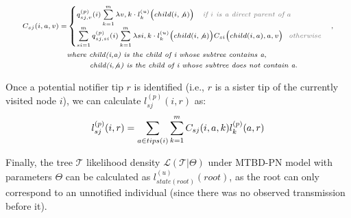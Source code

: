 \documentclass[a4paper,10pt]{article}
\begin{document}
\begin{equation}
\scriptsize
\begin{split}
C_{sj}(i,a,v) = &\begin{cases}
q^{(p)}_{sj,v}(i)
\sum\limits_{k=1}^{m}\lambda{v,k} \cdot l_{k}^{(u)}\Big(child(i, \not a)\Big) \textit{\color{gray}~~~if $i$ is a direct parent of $a$}
\\
\sum\limits_{si=1}^{m}q^{(p)}_{sj,si}(i)
\sum\limits_{k=1}^{m}\lambda{si,k} \cdot l_{k}^{(u)}\Big(child(i, \not a)\Big)C_{si}\Big(child(i, a),a,v\Big) \textit{\color{gray}~~otherwise}\\ 
\end{cases},
\\ &\textit{where child(i,a) is the child of i whose subtree contains a},
\\
 &\textit{~~~~~~~~child(i,$\not a$) is the child of i whose subtree does not contain a.}
\end{split}
\label{eq:c}
\end{equation}


Once a potential notifier tip $r$ is identified (i.e., $r$ is a sister tip of the currently visited node $i$), we can calculate $l^{(p)}_{sj}(i, r)$ as:
\begin{equation}
\scriptsize 
l^{(p)}_{sj}(i, r) = \sum\limits_{a \in tips(i)}\sum\limits_{k=1}^{m} C_{sj}(i, a, k) l^{(p)}_{k}(a, r)\label{eq:lp}
\end{equation}


Finally, the tree $\mathscr{T}$ likelihood density $\mathscr{L}(\mathscr{T}|\Theta)$ under MTBD-PN model with parameters $\Theta$ can be calculated as $l^{(u)}_{state(root)}(root)$, as the root can only correspond to an unnotified individual (since there was no observed transmission before it).

\end{document}
